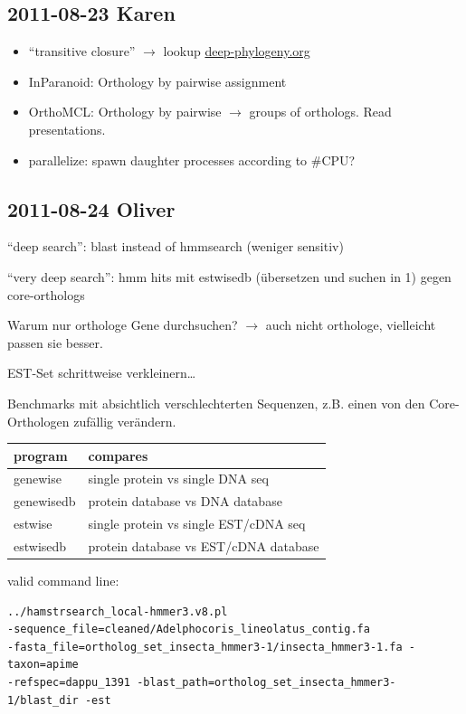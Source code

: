 \subsection*{2011-08-23 Karen}

\begin{itemize}
	\item ``transitive closure'' $\rightarrow$ lookup \url{deep-phylogeny.org}
	\item InParanoid: Orthology by pairwise assignment
	\item OrthoMCL: Orthology by pairwise $\rightarrow$ groups of orthologs. Read
		presentations.
	\item parallelize: spawn daughter processes according to \#CPU?
\end{itemize}

\subsection*{2011-08-24 Oliver}

``deep search'': blast instead of hmmsearch (weniger sensitiv)

``very deep search'': hmm hits mit estwisedb (übersetzen und suchen in 1) gegen
core-orthologs

Warum nur orthologe Gene durchsuchen? $\rightarrow$ auch nicht orthologe,
vielleicht passen sie besser.

EST-Set schrittweise verkleinern\dots

Benchmarks mit absichtlich verschlechterten Sequenzen, z.B. einen von den
Core-Orthologen zufällig verändern.

\begin{table}
	\begin{tabular}{l l}
	\textbf{program} & \textbf{compares} \\
	\hline
	genewise   & single protein vs single DNA seq \\
	genewisedb & protein database vs DNA database \\
	estwise    & single protein vs single EST/cDNA seq \\
	estwisedb  & protein database vs EST/cDNA database
	\end{tabular}
\end{table}

valid command line:
\begin{verbatim}
../hamstrsearch_local-hmmer3.v8.pl
-sequence_file=cleaned/Adelphocoris_lineolatus_contig.fa
-fasta_file=ortholog_set_insecta_hmmer3-1/insecta_hmmer3-1.fa -taxon=apime
-refspec=dappu_1391 -blast_path=ortholog_set_insecta_hmmer3-1/blast_dir -est
\end{verbatim}

